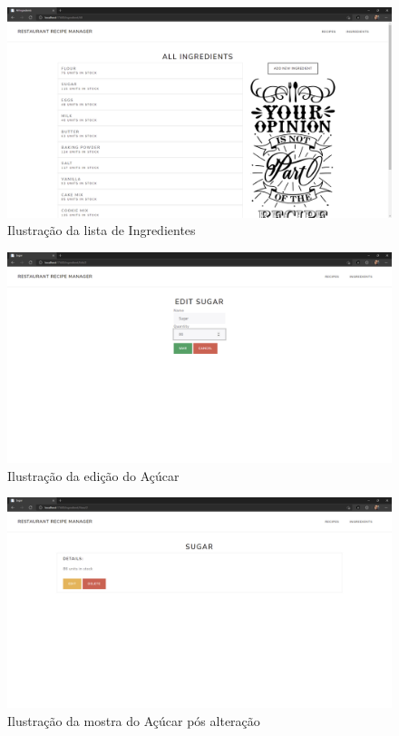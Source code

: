 \begin{figure}[!hbt]
    \centering
    \includegraphics[width=14cm]{Resources/WebApp/Ingredients/ingredient (1).png}
    \caption{Ilustração da lista de Ingredientes}
    \label{fig:app_ing_1}
\end{figure}
\FloatBarrier
\begin{figure}[!hbt]
    \centering
    \includegraphics[width=14cm]{Resources/WebApp/Ingredients/ingredient (2).png}
    \caption{Ilustração da edição do Açúcar}
    \label{fig:app_ing_2}
\end{figure}
\FloatBarrier
\begin{figure}[!hbt]
    \centering
    \includegraphics[width=14cm]{Resources/WebApp/Ingredients/ingredient (3).png}
    \caption{Ilustração da mostra do Açúcar pós alteração}
    \label{fig:app_ing_3}
\end{figure}
